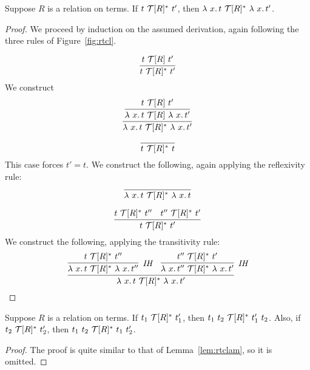\begin{lemma}
\label{lem:rtclam}
Suppose $R$ is a relation on terms.  
If $t\ \Tau[R]^*\ t'$, then $\lam{x}{t}\ \Tau[R]^*\ \lam{x}{t'}$.
\end{lemma}
\begin{proof}
We proceed by induction on the assumed derivation, again following the three rules of Figure~\ref{fig:rtcl}.

  \case{ }
  \[
  \infer{t\ \Tau[R]^*\ t'}{t\ \Tau[R]\ t'}
  \]
  \noindent We construct
  \[
  \infer{\lam{x}{t}\ \Tau[R]^*\ \lam{x}{t'}}
        {\infer{\lam{x}{t}\ \Tau[R]\ \lam{x}{t'}}
               {t\ \Tau[R]\ t'}}
  \]

  \case{ }
  \[
  \infer{t\ \Tau[R]^*\ t}{\ }
  \]
  \noindent This case forces $t' = t$.  We construct the following, again applying the reflexivity rule:
  \[
  \infer{\lam{x}{t}\ \Tau[R]^*\ \lam{x}{t}}{\ }
  \]

  \case{ }
  \[
  \infer{t\ \Tau[R]^*\ t'}{t\ \Tau[R]^*\ t'' & t''\ \Tau[R]^*\ t'}
  \]
  \noindent We construct the following, applying the transitivity rule:
  \[
  \infer{\lam{x}{t}\ \Tau[R]^*\ \lam{x}{t'}}{\infer[\textit{IH}]{\lam{x}{t}\ \Tau[R]^*\ \lam{x}{t''}}{t\ \Tau[R]^*\ t''}
                                             & \infer[\textit{IH}]{\lam{x}{t''}\ \Tau[R]^*\ \lam{x}{t'}}{t''\ \Tau[R]^*\ t'}}
  \]

\end{proof}

\begin{lemma}
\label{lem:rtcapp}
Suppose $R$ is a relation on terms.  
If $t_1\ \Tau[R]^*\ t_1'$, then $t_1\ t_2\ \Tau[R]^*\ t_1'\ t_2$.  Also,
if $t_2\ \Tau[R]^*\ t_2'$, then $t_1\ t_2\ \Tau[R]^*\ t_1\ t_2'$.
\end{lemma}
\begin{proof}
The proof is quite similar to that of Lemma~\ref{lem:rtclam}, so it is omitted.
\end{proof}

